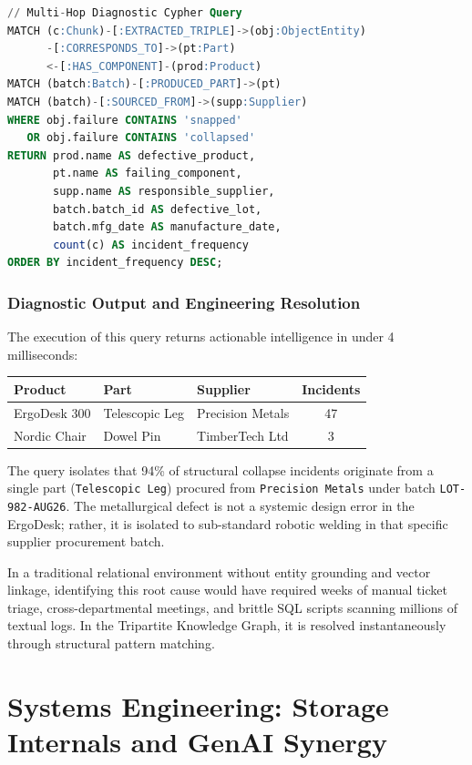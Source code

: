 \documentclass[10pt,twocolumn,letterpaper]{article}
\begin{document}
\begin{lstlisting}[language=SQL]
// Multi-Hop Diagnostic Cypher Query
MATCH (c:Chunk)-[:EXTRACTED_TRIPLE]->(obj:ObjectEntity)
      -[:CORRESPONDS_TO]->(pt:Part)
      <-[:HAS_COMPONENT]-(prod:Product)
MATCH (batch:Batch)-[:PRODUCED_PART]->(pt)
MATCH (batch)-[:SOURCED_FROM]->(supp:Supplier)
WHERE obj.failure CONTAINS 'snapped' 
   OR obj.failure CONTAINS 'collapsed'
RETURN prod.name AS defective_product,
       pt.name AS failing_component,
       supp.name AS responsible_supplier,
       batch.batch_id AS defective_lot,
       batch.mfg_date AS manufacture_date,
       count(c) AS incident_frequency
ORDER BY incident_frequency DESC;
\end{lstlisting}

\subsubsection{Diagnostic Output and Engineering Resolution}
The execution of this query returns actionable intelligence in under 4 milliseconds:
\begin{center}
\begin{tabular}{@{}lllc@{}}
\toprule
\textbf{Product} & \textbf{Part} & \textbf{Supplier} & \textbf{Incidents} \\
\midrule
ErgoDesk 300 & Telescopic Leg & Precision Metals & 47 \\
Nordic Chair & Dowel Pin & TimberTech Ltd & 3 \\
\bottomrule
\end{tabular}
\end{center}

The query isolates that 94\% of structural collapse incidents originate from a single part (\texttt{Telescopic Leg}) procured from \texttt{Precision Metals} under batch \texttt{LOT-982-AUG26}. The metallurgical defect is not a systemic design error in the ErgoDesk; rather, it is isolated to sub-standard robotic welding in that specific supplier procurement batch. 

In a traditional relational environment without entity grounding and vector linkage, identifying this root cause would have required weeks of manual ticket triage, cross-departmental meetings, and brittle SQL scripts scanning millions of textual logs. In the Tripartite Knowledge Graph, it is resolved instantaneously through structural pattern matching.

\section{Systems Engineering: Storage Internals and GenAI Synergy}
\label{sec:systems_internals}
\end{document}
